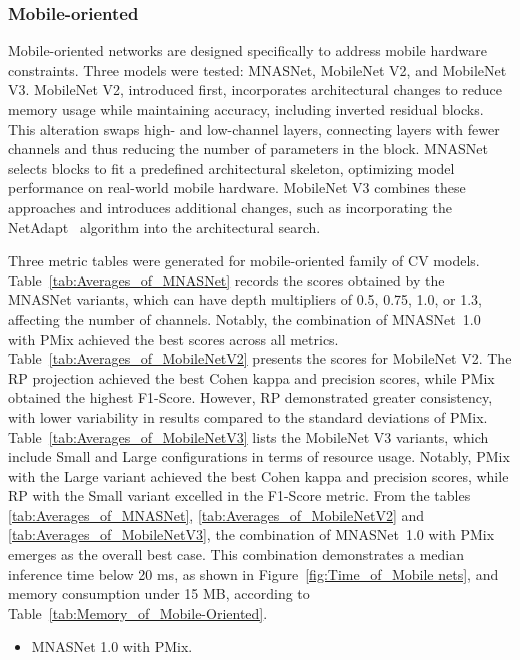 




\FloatBarrier

\subsubsection{Mobile-oriented}

Mobile-oriented networks are designed specifically to address mobile hardware constraints. Three models were tested: MNASNet, MobileNet V2, and MobileNet V3. MobileNet V2, introduced first, incorporates architectural changes to reduce memory usage while maintaining accuracy, including inverted residual blocks. This alteration swaps high- and low-channel layers, connecting layers with fewer channels and thus reducing the number of parameters in the block. MNASNet selects blocks to fit a predefined architectural skeleton, optimizing model performance on real-world mobile hardware. MobileNet V3 combines these approaches and introduces additional changes, such as incorporating the NetAdapt~\cite{NetAdapt} algorithm into the architectural search.


Three metric tables were generated for mobile-oriented family of \gls{CV} models.
Table~\ref{tab:Averages_of_MNASNet} records the scores obtained by the MNASNet variants, which can have depth multipliers of 0.5, 0.75, 1.0, or 1.3, affecting the number of channels. Notably, the combination of \mbox{MNASNet 1.0} with \gls{PMix} achieved the best scores across all metrics.
Table~\ref{tab:Averages_of_MobileNetV2} presents the scores for MobileNet V2. The \gls{RP} projection achieved the best Cohen kappa and precision scores, while \gls{PMix} obtained the highest F1-Score. However, \gls{RP} demonstrated greater consistency, with lower variability in results compared to the standard deviations of \gls{PMix}.
Table~\ref{tab:Averages_of_MobileNetV3} lists the MobileNet V3 variants, which include Small and Large configurations in terms of resource usage. Notably, \gls{PMix} with the Large variant achieved the best Cohen kappa and precision scores, while \gls{RP} with the Small variant excelled in the F1-Score metric.
From the tables \ref{tab:Averages_of_MNASNet}, \ref{tab:Averages_of_MobileNetV2} and \ref{tab:Averages_of_MobileNetV3}, the combination of \mbox{MNASNet 1.0} with \gls{PMix} emerges as the overall best case. This combination demonstrates a median inference time below 20 ms, as shown in Figure~\ref{fig:Time_of_Mobile nets}, and memory consumption under 15 MB, according to Table~\ref{tab:Memory_of_Mobile-Oriented}.  
\begin{itemize}
	\item MNASNet 1.0 with \gls{PMix}.
\end{itemize}


